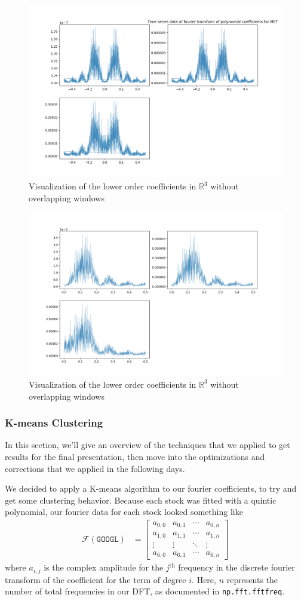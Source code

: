 \documentclass[final]{article}
\begin{document}
\begin{figure}[H]
  \centering
  \includegraphics[width=.55\linewidth]{img/fourier2}
  \caption{Visualization of the lower order coefficients in $\mathbb{R}^3$
  without overlapping windows}
  \label{fig:fourier2}
\end{figure}

\begin{figure}[H]
  \centering
  \includegraphics[width=.55\linewidth]{img/fourier3}
  \caption{Visualization of the lower order coefficients in $\mathbb{R}^3$
  without overlapping windows}
  \label{fig:fourier3}
\end{figure}

\subsubsection{K-means Clustering}

In this section, we'll give an overview of the techniques that we
applied to get results for the final presentation, then move into the
optimizations and corrections that we applied in the following days.

We decided to apply a K-means algorithm to our fourier coefficients,
to try and get some clustering behavior. Because each stock was fitted
with a quintic polynomial, our fourier data for each stock looked
something like
\begin{align*}
  \mathcal{F}(\texttt{GOOGL})
  &=
    \begin{bmatrix}
      a_{0,0} & a_{0,1} & \cdots & a_{0,n} \\
      a_{1,0} & a_{1,1} & \cdots & a_{1,n} \\
      \vdots & \vdots & \ddots & \vdots \\
      a_{6,0} & a_{6,1} & \cdots & a_{6,n}
    \end{bmatrix}
\end{align*}
where $a_{i,j}$ is the complex amplitude for the $j^{\text{th}}$
frequency in the discrete fourier transform of the coefficient for the
term of degree $i$. Here, $n$ represents the number of total
frequencies in our DFT, as documented in \texttt{np.fft.fftfreq}.
\end{document}
